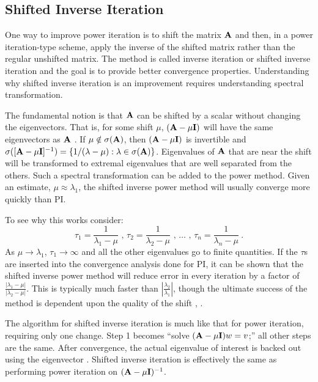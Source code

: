 \subsection{Shifted Inverse Iteration}
One way to improve power iteration is to shift the matrix $\mathbf{A}$ and then, in a power iteration-type scheme, apply the inverse of the shifted matrix rather than the regular unshifted matrix. The method is called inverse iteration or shifted inverse iteration and the goal is to provide better convergence properties. Understanding why shifted inverse iteration is an improvement requires understanding spectral transformation. 

The fundamental notion is that $\mathbf{A}$ can be shifted by a scalar without changing the eigenvectors. That is, for some shift $\mu$, $(\mathbf{A} - \mu \mathbf{I})$ will have the same eigenvectors as $\mathbf{A}$ \cite{Sorensen1996}. If $\mu \notin \sigma(\mathbf{A})$, then $(\mathbf{A} - \mu \mathbf{I})$ is invertible and $\sigma([\mathbf{A} - \mu \mathbf{I}]^{-1}) = \{1/(\lambda - \mu):\lambda \in \sigma(\mathbf{A})\}$. Eigenvalues of $\mathbf{A}$ that are near the shift will be transformed to extremal eigenvalues that are well separated from the others. Such a spectral transformation can be added to the power method. Given an estimate, $\mu \approx \lambda_1$, the shifted inverse power method will usually converge more quickly than PI.

To see why this works consider: 
%
\begin{equation}
    \tau_1 = \frac{1}{\lambda_1 - \mu}\text{ , }\tau_2 = \frac{1}{\lambda_2 - \mu}\text{ , }\dots\text{ , }\tau_n = \frac{1}{\lambda_n - \mu} \:.
\end{equation}
%
As $\mu \to \lambda_1$, $\tau_1 \to \infty$ and all the other eigenvalues go to finite quantities. If the $\tau$s are inserted into the convergence analysis done for PI, it can be shown that the shifted inverse power method will reduce error in every iteration by a factor of $\frac{|\lambda_{1} - \mu|}{|\lambda_{2} - \mu|}$. This is typically much faster than $|\frac{\lambda_{2}}{\lambda_{1}}|$, though the ultimate success of the method is dependent upon the quality of the shift \cite{Sorensen1996}, \cite{Trefethen1997}. 

The algorithm for shifted inverse iteration is much like that for power iteration, requiring only one change. Step 1 becomes ``solve $(\mathbf{A}-\mu \mathbf{I})w = v$;'' all other steps are the same. After convergence, the actual eigenvalue of interest is backed out using the eigenvector \cite{Sorensen1996}.  Shifted inverse iteration is effectively the same as performing power iteration on $(\mathbf{A}-\mu \mathbf{I})^{-1}$. 

